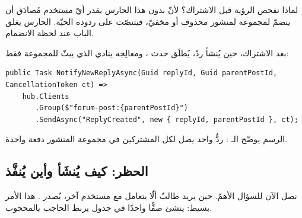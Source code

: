 لماذا نفحص الرؤية قبل الاشتراك؟ لأنّ بدون هذا الحارس يقدر أيّ مستخدم مُصادَق أن ينضمّ
لمجموعة  لمنشور محذوف أو مخفيّ، فيتنصّت على ردوده الحيّة. الحارس يغلق
الباب عند لحظة الانضمام.

بعد الاشتراك، حين يُنشأ ردّ، يُطلَق حدث ، ومعالِجه ينادي
 الذي يبثّ للمجموعة فقط:

\begin{english}
\begin{lstlisting}[language={[Sharp]C}]
public Task NotifyNewReplyAsync(Guid replyId, Guid parentPostId, CancellationToken ct) =>
    hub.Clients
       .Group($"forum-post:{parentPostId}")
       .SendAsync("ReplyCreated", new { replyId, parentPostId }, ct);
\end{lstlisting}
\end{english}

الرسم يوضّح الـ : ردٌّ واحد يصل لكل المشتركين في مجموعة المنشور دفعة واحدة.

\begin{center}
\begin{LTR}
\end{LTR}
\end{center}

\subsection{الحظر: كيف يُنشَأ وأين يُنفَّذ}

نصل الآن للسؤال الأهمّ. حين يريد طالبٌ ألّا يتعامل مع مستخدم آخر، يُصدر
. هذا الأمر بسيط: ينشئ صفًّا واحدًا في جدول  يربط
الحاجب بالمحجوب.

